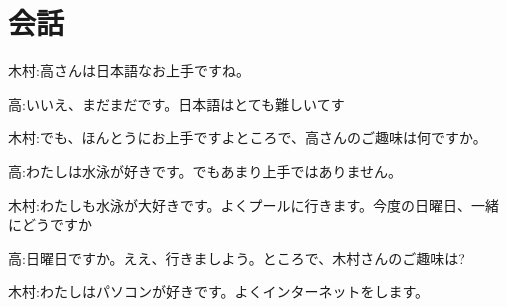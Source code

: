     \section{会話}
    木村:高さんは日本語なお上手ですね。

    高:いいえ、まだまだです。日本語はとても難しいてす

    木村:でも、ほんとうにお上手ですよところで、高さんのご趣味は何ですか。

    高:わたしは水泳が好きです。でもあまり上手ではありません。

    木村:わたしも水泳が大好きです。よくプールに行きます。今度の日曜日、一緒にどうですか

    高:日曜日ですか。ええ、行きましよう。ところで、木村さんのご趣味は?

    木村:わたしはパソコンが好きです。よくインターネットをします。

